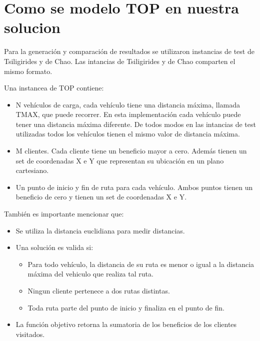 \section{Como se modelo TOP en nuestra solucion}

Para la generación y comparación de resultados se utilizaron instancias de test de Tsiligirides y de Chao. Las intancias de Tsiligirides y de Chao comparten el mismo formato. 

\bigskip

\begin{minipage}{\textwidth}
Una instancea de TOP contiene:

\begin{itemize}
  \item N vehículos de carga, cada vehículo tiene una distancia máxima, llamada TMAX, que puede recorrer. En esta implementación cada vehículo puede tener una distancia máxima diferente. De todos modos en las intancias de test utilizadas todos los vehículos tienen el mismo valor de distancia máxima.
  \item M clientes. Cada cliente tiene un beneficio mayor a cero. Además tienen un set de coordenadas X e Y que representan su ubicación en un plano cartesiano.
  \item Un punto de inicio y fin de ruta para cada vehículo. Ambos puntos tienen un beneficio de cero y tienen un set de coordenadas X e Y.
\end{itemize}
\end{minipage}

\bigskip

\begin{minipage}{\textwidth}
También es importante mencionar que:

\begin{itemize}
	\item Se utiliza la distancia euclidiana para medir distancias.
	\item Una solución es valida si:
	\begin{itemize}
		\item Para todo vehículo, la distancia de su ruta es menor o igual a la distancia máxima del vehiculo que realiza tal ruta.
		\item Ningun cliente pertenece a dos rutas distintas.
		\item Toda ruta parte del punto de inicio y finaliza en el punto de fin.
	\end{itemize}
	\item La función objetivo retorna la sumatoria de los beneficios de los clientes visitados.
\end{itemize}
\end{minipage}





























